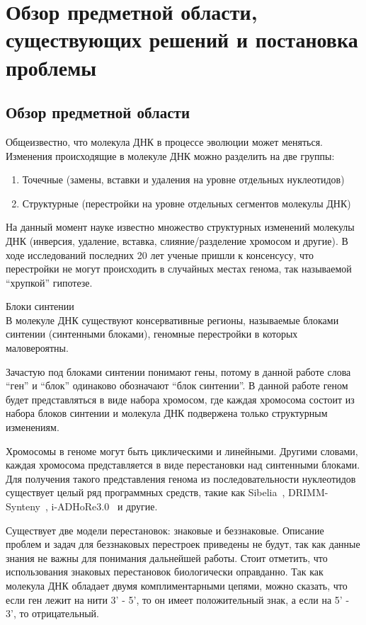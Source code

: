 \chapter{Обзор предметной области, существующих решений и постановка проблемы}

\section{Обзор предметной области}
Общеизвестно, что молекула ДНК в процессе эволюции может меняться.
Изменения происходящие в молекуле ДНК можно разделить на две группы:
\begin{enumerate}
  \item Точечные (замены, вставки и удаления на уровне отдельных нуклеотидов)
  \item Структурные (перестройки на уровне отдельных сегментов молекулы ДНК)
\end{enumerate}
На данный момент науке известно множество структурных изменений молекулы ДНК (инверсия, удаление, вставка, слияние/разделение хромосом и другие).
В ходе исследований последних 20 лет ученые пришли к консенсусу, что перестройки не могут происходить в случайных местах генома,
так называемой ``хрупкой'' гипотезе.

\begin{define}{Блоки синтении} \\
  В молекуле ДНК существуют консервативные регионы, называемые блоками синтении (синтенными блоками),
  геномные перестройки в которых маловероятны.
\end{define}

Зачастую под блоками синтении понимают гены, потому в данной работе слова ``ген'' и ``блок'' одинаково обозначают ``блок синтении''.
В данной работе геном будет представляться в виде набора хромосом,
где каждая хромосома состоит из набора блоков синтении и молекула ДНК подвержена только структурным изменениям.

Хромосомы в геноме могут быть циклическими и линейными.
Другими словами, каждая хромосома представляется в виде перестановки над синтенными блоками.
Для получения такого представления генома из последовательности нуклеотидов существует целый ряд программных средств,
такие как Sibelia~\cite{minkin2013sibelia}, DRIMM-Synteny~\cite{pham2010drimm}, i-ADHoRe3.0~\cite{proost2012adhore} и другие.

Существует две модели перестановок: знаковые и беззнаковые.
Описание проблем и задач для беззнаковых перестроек приведены не будут, так как данные знания не важны для понимания дальнейшей работы.
Стоит отметить, что использования знаковых перестановок биологически оправданно.
Так как молекула ДНК обладает двумя комплиментарными цепями, можно сказать,
что если ген лежит на нити 3' - 5', то он имеет положительный знак, а если на 5' - 3', то отрицательный.

